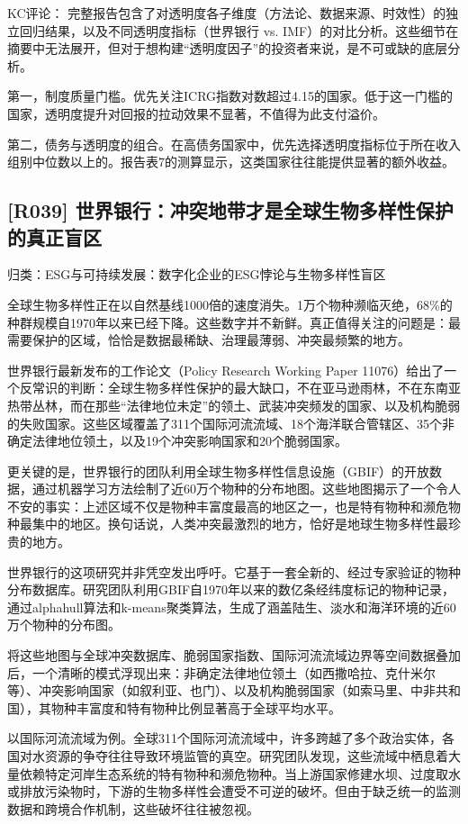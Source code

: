\documentclass[11pt]{ctexart}
\begin{document}
KC评论： 完整报告包含了对透明度各子维度（方法论、数据来源、时效性）的独立回归结果，以及不同透明度指标（世界银行 vs. IMF）的对比分析。这些细节在摘要中无法展开，但对于想构建“透明度因子”的投资者来说，是不可或缺的底层分析。

第一，制度质量门槛。优先关注ICRG指数对数超过4.15的国家。低于这一门槛的国家，透明度提升对回报的拉动效果不显著，不值得为此支付溢价。

第二，债务与透明度的组合。在高债务国家中，优先选择透明度指标位于所在收入组别中位数以上的。报告表7的测算显示，这类国家往往能提供显著的额外收益。

\subsection{[R039] 世界银行：冲突地带才是全球生物多样性保护的真正盲区}
{\small\color{refgray}归类：ESG与可持续发展：数字化企业的ESG悖论与生物多样性盲区}

全球生物多样性正在以自然基线1000倍的速度消失。1万个物种濒临灭绝，68\%的种群规模自1970年以来已经下降。这些数字并不新鲜。真正值得关注的问题是：最需要保护的区域，恰恰是数据最稀缺、治理最薄弱、冲突最频繁的地方。

世界银行最新发布的工作论文（Policy Research Working Paper 11076）给出了一个反常识的判断：全球生物多样性保护的最大缺口，不在亚马逊雨林，不在东南亚热带丛林，而在那些“法律地位未定”的领土、武装冲突频发的国家、以及机构脆弱的失败国家。这些区域覆盖了311个国际河流流域、18个海洋联合管辖区、35个非确定法律地位领土，以及19个冲突影响国家和20个脆弱国家。

更关键的是，世界银行的团队利用全球生物多样性信息设施（GBIF）的开放数据，通过机器学习方法绘制了近60万个物种的分布地图。这些地图揭示了一个令人不安的事实：上述区域不仅是物种丰富度最高的地区之一，也是特有物种和濒危物种最集中的地区。换句话说，人类冲突最激烈的地方，恰好是地球生物多样性最珍贵的地方。

世界银行的这项研究并非凭空发出呼吁。它基于一套全新的、经过专家验证的物种分布数据库。研究团队利用GBIF自1970年以来的数亿条经纬度标记的物种记录，通过alphahull算法和k-means聚类算法，生成了涵盖陆生、淡水和海洋环境的近60万个物种的分布图。

将这些地图与全球冲突数据库、脆弱国家指数、国际河流流域边界等空间数据叠加后，一个清晰的模式浮现出来：非确定法律地位领土（如西撒哈拉、克什米尔等）、冲突影响国家（如叙利亚、也门）、以及机构脆弱国家（如索马里、中非共和国），其物种丰富度和特有物种比例显著高于全球平均水平。

以国际河流流域为例。全球311个国际河流流域中，许多跨越了多个政治实体，各国对水资源的争夺往往导致环境监管的真空。研究团队发现，这些流域中栖息着大量依赖特定河岸生态系统的特有物种和濒危物种。当上游国家修建水坝、过度取水或排放污染物时，下游的生物多样性会遭受不可逆的破坏。但由于缺乏统一的监测数据和跨境合作机制，这些破坏往往被忽视。
\end{document}
